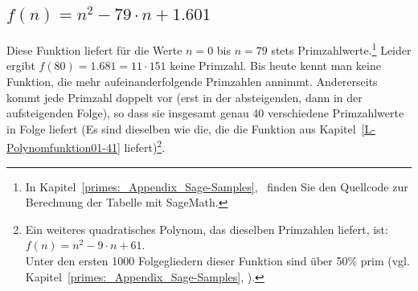 \begin{refsegment}
\subsection{\texorpdfstring{$f(n) = n^2 - 79 \cdot n + 1.601$}{f(n) = n\^{}2 - 79 ... n + 1.601}}
\label{L-Polynomfunktion02-1601}   \label{SrcPrimArith1}
   Diese Funktion liefert für die Werte $n=0$ bis $n=79$ stets
   Primzahlwerte.\footnote{%
   In Kapitel~\ref{primes:_Appendix_Sage-Samples},
   \glqq {}\grqq~finden Sie den
   Quellcode zur Berechnung der Tabelle mit SageMath.}
   Leider ergibt $f(80) = 1.681 = 11 \cdot 151$ keine Primzahl. Bis heute
   kennt man keine Funktion, die mehr aufeinanderfolgende Primzahlen annimmt.
   Andererseits kommt jede Primzahl doppelt vor (erst in der absteigenden,
   dann in der aufsteigenden Folge), so dass sie insgesamt genau 40
   verschiedene Primzahlwerte in Folge liefert (Es sind dieselben wie die, die
   die Funktion aus Kapitel~\ref{L-Polynomfunktion01-41} liefert)\footnote{%
   Ein weiteres quadratisches Polynom, das dieselben Primzahlen liefert, ist:
   $f(n) = n^2 - 9 \cdot n + 61$.\\ Unter den ersten 1000 Folgegliedern dieser
   Funktion sind über 50\% prim (vgl. Kapitel~\ref{primes:_Appendix_Sage-Samples},
   \glqq {}\grqq).}.


\end{refsegment}
